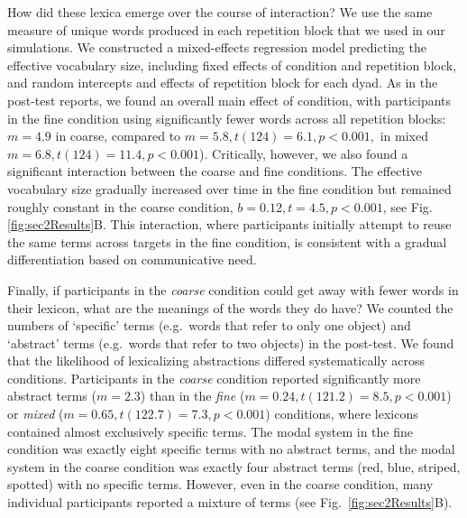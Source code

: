 How did these lexica emerge over the course of interaction? 
We use the same measure of unique words produced in each repetition block that we used in our simulations. 
We constructed a mixed-effects regression model predicting the effective vocabulary size, including fixed effects of condition and repetition block, and random intercepts and effects of repetition block for each dyad. 
As in the post-test reports, we found an overall main effect of condition, with participants in the fine condition using significantly fewer words across all repetition blocks: $m = 4.9$ in coarse, compared to $m=5.8, t(124)=6.1, p <0.001,$ in mixed $m=6.8, t(124) =11.4, p < 0.001$).
Critically, however, we also found a significant interaction between the coarse and fine conditions. 
The effective vocabulary size gradually increased over time in the fine condition but remained roughly constant in the coarse condition, $b = 0.12, t = 4.5, p < 0.001$, see Fig. \ref{fig:sec2Results}B.
This interaction, where participants initially attempt to reuse the same terms across targets in the fine condition, is consistent with a gradual differentiation based on communicative need.

Finally, if participants in the \emph{coarse} condition could get away with fewer words in their lexicon, what are the meanings of the words they do have? 
We counted the numbers of `specific' terms (e.g.~words that refer to only one object) and `abstract' terms (e.g.~words that refer to two objects) in the post-test. 
We found that the likelihood of lexicalizing abstractions differed systematically across conditions.
Participants in the \emph{coarse} condition reported significantly more abstract terms ($m=2.3$) than in the \emph{fine} ($m = 0.24, t(121.2) = 8.5, p < 0.001$) or \emph{mixed} ($m=0.65, t(122.7)= 7.3, p < 0.001$) conditions, where lexicons contained almost exclusively specific terms.
The modal system in the fine condition was exactly eight specific terms with no abstract terms, and the modal system in the coarse condition was exactly four abstract terms (red, blue, striped, spotted) with no specific terms.
However, even in the coarse condition, many individual participants reported a mixture of terms (see Fig.\ \ref{fig:sec2Results}B).




